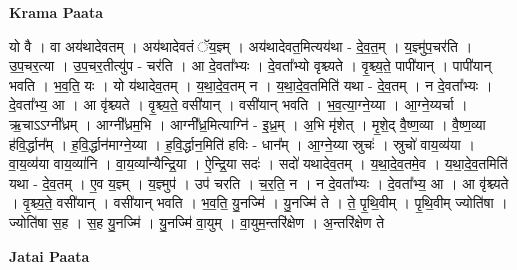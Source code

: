 \documentclass[17pt]{extarticle}
\begin{document}
\textbf{Krama Paata} \newline

यो वै । वा अय॑थादेवतम् । अय॑थादेवतं ॅय॒ज्ञ्म् । अय॑थादेवत॒मित्यय॑था - दे॒व॒त॒म् । य॒ज्ञ्मु॑प॒चर॑ति । उ॒प॒चर॒त्या । उ॒प॒चर॒तीत्यु॑प - चर॑ति । आ दे॒वता᳚भ्यः । दे॒वता᳚भ्यो वृश्च्यते । वृ॒श्च्य॒ते॒ पापी॑यान् । पापी॑यान् भवति । भ॒व॒ति॒ यः । यो य॑थादेव॒तम् । य॒था॒दे॒व॒तम् न । य॒था॒दे॒व॒तमिति॑ यथा - दे॒व॒तम् । न दे॒वता᳚भ्यः । दे॒वता᳚भ्य॒ आ । आ वृ॑श्च्यते । वृ॒श्च्य॒ते॒ वसी॑यान् । वसी॑यान् भवति । भ॒व॒त्या॒ग्ने॒य्या । आ॒ग्ने॒य्यर्चा । ऋ॒चाऽऽग्नी᳚ध्रम् । आग्नी᳚ध्रम॒भि । आग्नी᳚ध्र॒मित्याग्नि॑ - इ॒ध्र॒म् । अ॒भि मृ॑शेत् । मृ॒शे॒द् वै॒ष्ण॒व्या । वै॒ष्ण॒व्या ह॑वि॒र्द्धान᳚म् । ह॒वि॒र्द्धान॑माग्ने॒य्या । ह॒वि॒र्द्धान॒मिति॑ हविः - धान᳚म् । आ॒ग्ने॒य्या स्रुचः॑ । स्रुचो॑ वाय॒व्य॑या । वा॒य॒व्य॑या वाय॒व्या॑नि । वा॒य॒व्या᳚न्यैन्द्रि॒या । ऐ॒न्द्रि॒या सदः॑ । सदो॑ यथादेव॒तम् । य॒था॒दे॒व॒तमे॒व । य॒था॒दे॒व॒तमिति॑ यथा - दे॒व॒तम् । ए॒व य॒ज्ञ्म् । य॒ज्ञ्मुप॑ । उप॑ चरति । च॒र॒ति॒ न । न दे॒वता᳚भ्यः । दे॒वता᳚भ्य॒ आ । आ वृ॑श्च्यते । वृ॒श्च्य॒ते॒ वसी॑यान् । वसी॑यान् भवति । भ॒व॒ति॒ यु॒नज्मि॑ । यु॒नज्मि॑ ते । ते॒ पृ॒थि॒वीम् । पृ॒थि॒वीम् ज्योति॑षा । ज्योति॑षा स॒ह । स॒ह यु॒नज्मि॑ । यु॒नज्मि॑ वा॒युम् । वा॒युम॒न्तरि॑क्षेण । अ॒न्तरि॑क्षेण ते \newline

\textbf{Jatai Paata} \newline
\end{document}

